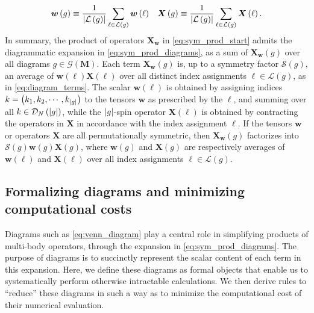 \documentclass[nofootinbib,notitlepage,11pt]{revtex4-2}
\newcommand{\f}[2]{\dfrac{#1}{#2}} %
\newcommand{\p}[1]{\left(#1\right)} %
\newcommand{\m}{\bm} %
\newcommand{\1}{\mathds{1}}
\newcommand{\D}{\mathcal{D}}
\newcommand{\G}{\mathcal{G}}
\renewcommand{\L}{\mathcal{L}}
\renewcommand{\S}{\mathcal{S}}
\begin{document}
\begin{align}
  \m w\p{g} \equiv \f1{\abs{\L\p{g}}}
  \sum_{\ell\in\L\p{g}} \m w\p{\ell}
  &&
  \m X\p{g} \equiv \f1{\abs{\L\p{g}}}
  \sum_{\ell\in\L\p{g}} \m X\p{\ell}.
  \label{eq:diagram_factors}
\end{align}
In summary, the product of operators $\m X_{\m w}$ in
\eqref{eq:sym_prod_start} admits the diagrammatic expansion in
\eqref{eq:sym_prod_diagrams}, as a sum of $\m X_{\m w}\p{g}$ over all
diagrams $g\in\G\p{\m M}$.  Each term $\m X_{\m w}\p{g}$ is, up to a
symmetry factor $\S\p{g}$, an average of $\m w\p{\ell} \m X\p{\ell}$
over all distinct index assignments $\ell\in\L\p{g}$, as in
\eqref{eq:diagram_terms}.  The scalar $\m w\p{\ell}$ is obtained by
assigning indices $k=\p{k_1,k_2,\cdots,k_{\abs{g}}}$ to the tensors
$\m w$ as prescribed by the $\ell$, and summing over all
$k\in\D_N\p{\abs{g}}$, while the $\abs{g}$-spin operator
$\m X\p{\ell}$ is obtained by contracting the operators in $\m X$ in
accordance with the index assignment $\ell$.  If the tensors $\m w$ or
operators $\m X$ are all permutationally symmetric, then
$\m X_{\m w}\p{g}$ factorizes into $\S\p{g} \m w\p{g} \m X\p{g}$,
where $\m w\p{g}$ and $\m X\p{g}$ are respectively averages of
$\m w\p{\ell}$ and $\m X\p{\ell}$ over all index assignments
$\ell\in\L\p{g}$.

\subsection{Formalizing diagrams and minimizing computational costs}
\label{sec:diagrams}

Diagrams such as \eqref{eq:venn_diagram} play a central role in
simplifying products of multi-body operators, through the expansion in
\eqref{eq:sym_prod_diagrams}.  The purpose of diagrams is to
succinctly represent the scalar content of each term in this
expansion.  Here, we define these diagrams as formal objects that
enable us to systematically perform otherwise intractable
calculations.  We then derive rules to ``reduce'' these diagrams in
such a way as to minimize the computational cost of their numerical
evaluation.
\end{document}
